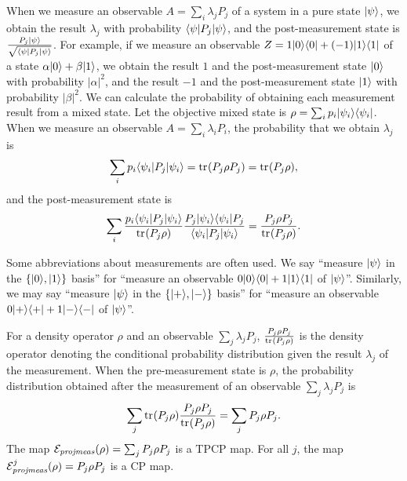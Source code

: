 When we measure an observable $A = \sum_i \lambda_j P_j$ of
a system in a pure state $|\psi\rangle$, we obtain
the result $\lambda_j$ with probability $\langle \psi|P_j
|\psi\rangle$, and the post-measurement state is 
$\frac{P_j |\psi\rangle}{\sqrt{\langle \psi|P_j|\psi\rangle}}$.
For example, if we measure an observable $Z = 1|0\rangle\langle 0|
+ (-1)|1\rangle\langle 1|$ of
a state $\alpha |0\rangle + \beta |1\rangle$, we obtain
the result $1$ and the post-measurement
state $|0\rangle$
with probability $|\alpha|^2$, and 
the result $-1$ and the post-measurement
state $|1\rangle$
with probability $|\beta|^2$.
We can calculate the probability of
obtaining each measurement result from a mixed state.
Let the objective mixed state is $\rho = 
\sum_i p_i |\psi_i\rangle\langle \psi_i|$.
When we measure an observable $A = \sum_i \lambda_i P_i$,
the probability that we obtain $\lambda_j$ is
\[
 \sum_i p_i \langle \psi_i| P_j |\psi_i\rangle 
 = {\rm tr}_{}(P_j \rho P_j)
 = {\rm tr}_{}(P_j \rho),
\]
and the post-measurement state is
\[
 \sum_i \frac{p_i \langle \psi_i|P_j|\psi_i\rangle}{{\rm tr}_{}(P_j \rho)} \frac{P_j|\psi_i\rangle\langle \psi_i|P_j}
 {\langle \psi_i|P_j|\psi_i\rangle}
 =
 \frac{P_j \rho P_j}{{\rm tr}_{}(P_j \rho)}.
\]

Some abbreviations about measurements are often used. We say
``measure $|\psi\rangle$ in the $\{|0\rangle,|1\rangle\}$ basis'' for
``measure an observable $0|0\rangle\langle 0|+1|1\rangle\langle 1|$ of
$|\psi\rangle$''. Similarly, 
we may say ``measure $|\psi\rangle$ in the $\{|+\rangle,|-\rangle\}$ basis'' for
``measure an observable $0|+\rangle\langle +|+1|-\rangle\langle -|$ of
$|\psi\rangle$''.

For a density operator $\rho$ and an observable $\sum_j \lambda_j P_j$,
$\frac{P_j \rho P_j}{{\rm tr}_{}(P_j \rho)}$ is the density operator
denoting the conditional probability distribution given the result $\lambda_j$ 
of the measurement. When the pre-measurement state is $\rho$,
the probability distribution obtained after the measurement of
an observable $\sum_j \lambda_j P_j$ is
\[
 \sum_j {\rm tr}_{}(P_j \rho) \frac{P_j \rho P_j}{{\rm tr}_{}(P_j \rho)} =
 \sum_j P_j \rho P_j.
\]
The map $\mathcal{E}_{\mathit{projmeas}}(\rho) =  \sum_j P_j \rho P_j$ is a
TPCP map. For all $j$, the map $\mathcal{E}^j_{\mathit{projmeas}}(\rho) =
P_j \rho P_j$ is a CP map.

